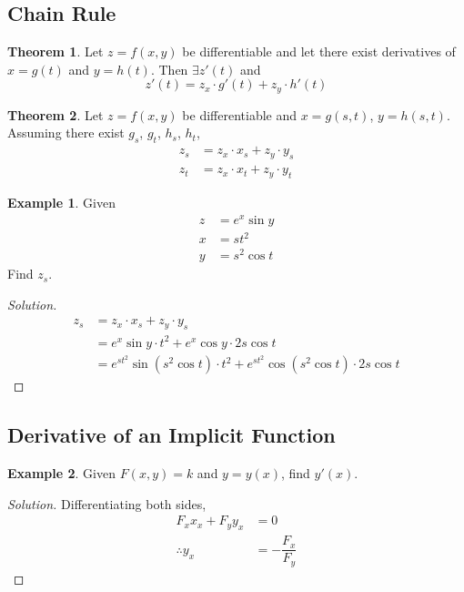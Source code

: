 \documentclass[fleqn, a4paper, 12pt]{article}
\theoremstyle{definition}
\newtheorem{example}{Example}
\theoremstyle{theorem}
\newtheorem{theorem}{Theorem}
\theoremstyle{remark}
\newenvironment{solution}
{\begin{proof}[Solution]\let\qed\relax}
	{\end{proof}}
\begin{document}
\subsection{Chain Rule}

\begin{theorem}
	Let $z = f(x, y)$ be differentiable and let there exist derivatives of $x = g(t)$ and $y = h(t)$. Then $\exists z'(t)$ and
	\begin{equation*}
		z'(t) = z_x \cdot g'(t) + z_y \cdot h'(t)
	\end{equation*}
\end{theorem}

\begin{theorem}
	Let $z = f(x, y)$ be differentiable and $x = g(s, t)$, $y = h(s, t)$. Assuming there exist $g_s$, $g_t$, $h_s$, $h_t$, 
	\begin{align*}
		z_s &= z_x \cdot x_s + z_y \cdot y_s\\
		z_t &= z_x \cdot x_t + z_y \cdot y_t
	\end{align*}
\end{theorem}

\begin{example}
	Given 
	\begin{align*}
		z &= e^x \sin y\\
		x &= s t^2\\
		y &= s^2 \cos t
	\end{align*}
	Find $z_s$.
\end{example}

\begin{solution}
	\begin{align*}
		z_s &= z_x \cdot x_s + z_y \cdot y_s\\
		&= e^x \sin y \cdot t^2 + e^x \cos y \cdot 2 s \cos t\\
		&= e^{s t^2} \sin (s^2 \cos t) \cdot t^2 + e^{s t^2} \cos(s^2 \cos t) \cdot 2 s \cos t
	\end{align*}
\end{solution}

\subsection{Derivative of an Implicit Function}

\begin{example}
	Given $F(x, y) = k$ and $y = y(x)$, find $y'(x)$.
\end{example}

\begin{solution}
	Differentiating both sides,
	\begin{align*}
		F_x x_x + F_y y_x &= 0\\
		\therefore y_x &= -\dfrac{F_x}{F_y}
	\end{align*}
\end{solution}
\end{document}

